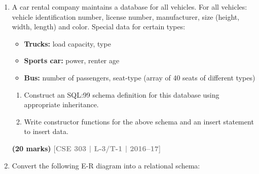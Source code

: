 \documentclass[12pt]{article}
\newcommand{\yr}[1]{\hfill\textcolor{gray}{\small\textbf{[#1]}}}
\newcommand{\mk}[1]{\textcolor{orange!70!black}{\small\textbf{(#1 marks)}}}
\begin{document}
\begin{enumerate}
\begin{center}
\end{center}


\mk{10} \yr{CSE 215 | L-2/T-2 | 2017--18}


\item A car rental company maintains a database for all vehicles. For all vehicles: vehicle identification number, license number, manufacturer, size (height, width, length) and color. Special data for certain types:
\begin{itemize}[leftmargin=1.5em,itemsep=1pt]
  \item \textbf{Trucks:} load capacity, type
  \item \textbf{Sports car:} power, renter age
  \item \textbf{Bus:} number of passengers, seat-type (array of 40 seats of different types)
\end{itemize}
\begin{enumerate}
  \item Construct an SQL:99 schema definition for this database using appropriate inheritance.
  \item Write constructor functions for the above schema and an insert statement to insert data.
\end{enumerate}
\mk{20} \yr{CSE 303 | L-3/T-1 | 2016--17}


\item Convert the following E-R diagram into a relational schema:


\end{enumerate}
\end{document}
